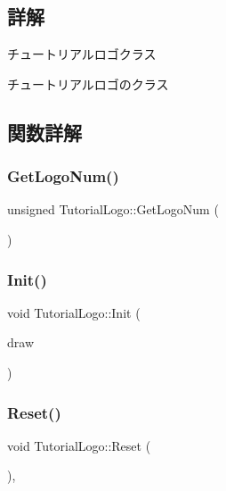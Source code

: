 \subsection{詳解}
チュートリアルロゴクラス 

チュートリアルロゴのクラス 

\subsection{関数詳解}
\mbox{\label{class_tutorial_logo_af4735bb34e06803ff13ae227fcf74e09}} 
\subsubsection{\texorpdfstring{Get\+Logo\+Num()}{GetLogoNum()}}
{\footnotesize\ttfamily unsigned Tutorial\+Logo\+::\+Get\+Logo\+Num (\begin{DoxyParamCaption}{ }\end{DoxyParamCaption})\hspace{0.3cm}{\ttfamily [inline]}}

\mbox{\label{class_tutorial_logo_a590f017a6b0532d08c1377b90b8fba3f}} 
\subsubsection{\texorpdfstring{Init()}{Init()}}
{\footnotesize\ttfamily void Tutorial\+Logo\+::\+Init (\begin{DoxyParamCaption}\item[{\mbox{\hyperlink{class_draw_base}{Draw\+Base}} $\ast$}]{draw }\end{DoxyParamCaption})}

\mbox{\label{class_tutorial_logo_a2c9e22c81cfeafbd34f50cc766a66cf1}} 
\subsubsection{\texorpdfstring{Reset()}{Reset()}}
{\footnotesize\ttfamily void Tutorial\+Logo\+::\+Reset (\begin{DoxyParamCaption}{ }\end{DoxyParamCaption})\hspace{0.3cm}{\ttfamily [override]}, {\ttfamily [virtual]}}



